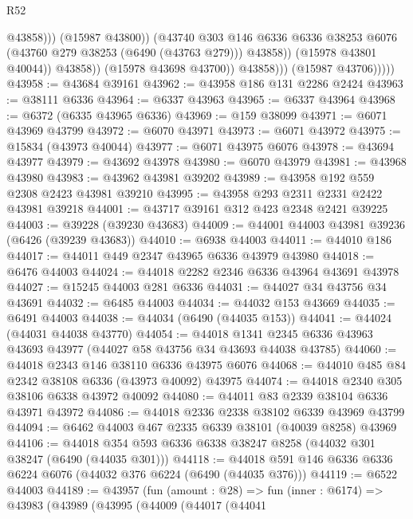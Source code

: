 \begin{lexlean}{R52}
\begin{coremodule}
                                    @43858)))
                              (@15987 @43800))
                            (@43740
                              @303
                              @146
                              @6336
                              @6336
                              @38253
                              @6076
                              (@43760 @279 @38253 (@6490 (@43763 @279)))
                              @43858))
                          (@15978 @43801 @40044))
                        @43858))
                    (@15978 @43698 @43700))
                  @43858)))
            (@15987 @43706)))))
@43958 := @43684 @39161
@43962 := @43958 @186 @131 @2286 @2424
@43963 := @38111 @6336
@43964 := @6337 @43963
@43965 := @6337 @43964
@43968 := @6372 (@6335 @43965 @6336)
@43969 := @159 @38099
@43971 := @6071 @43969 @43799
@43972 := @6070 @43971
@43973 := @6071 @43972
@43975 := @15834 (@43973 @40044)
@43977 := @6071 @43975 @6076
@43978 := @43694 @43977
@43979 := @43692 @43978
@43980 := @6070 @43979
@43981 := @43968 @43980
@43983 := @43962 @43981 @39202
@43989 := @43958 @192 @559 @2308 @2423 @43981 @39210
@43995 := @43958 @293 @2311 @2331 @2422 @43981 @39218
@44001 := @43717 @39161 @312 @423 @2348 @2421 @39225
@44003 := @39228 (@39230 @43683)
@44009 := @44001 @44003 @43981 @39236 (@6426 (@39239 @43683))
@44010 := @6938 @44003
@44011 := @44010 @186
@44017 := @44011 @449 @2347 @43965 @6336 @43979 @43980
@44018 := @6476 @44003
@44024 := @44018 @2282 @2346 @6336 @43964 @43691 @43978
@44027 := @15245 @44003 @281 @6336
@44031 := @44027 @34 @43756 @34 @43691
@44032 := @6485 @44003
@44034 := @44032 @153 @43669
@44035 := @6491 @44003
@44038 := @44034 (@6490 (@44035 @153))
@44041 := @44024 (@44031 @44038 @43770)
@44054 := @44018 @1341 @2345 @6336 @43963 @43693 @43977 (@44027 @58 @43756 @34 @43693 @44038 @43785)
@44060 := @44018 @2343 @146 @38110 @6336 @43975 @6076
@44068 := @44010 @485 @84 @2342 @38108 @6336 (@43973 @40092) @43975
@44074 := @44018 @2340 @305 @38106 @6338 @43972 @40092
@44080 := @44011 @83 @2339 @38104 @6336 @43971 @43972
@44086 := @44018 @2336 @2338 @38102 @6339 @43969 @43799
@44094 := @6462 @44003 @467 @2335 @6339 @38101 (@40039 @8258) @43969
@44106 := @44018 @354 @593 @6336 @6338 @38247 @8258 (@44032 @301 @38247 (@6490 (@44035 @301)))
@44118 := @44018 @591 @146 @6336 @6336 @6224 @6076 (@44032 @376 @6224 (@6490 (@44035 @376)))
@44119 := @6522 @44003
@44189 := @43957
    (fun (amount : @28) =>
    fun (inner : @6174) =>
    @43983
      (@43989
        (@43995
          (@44009
            (@44017
              (@44041

\end{coremodule}
\end{lexlean}
